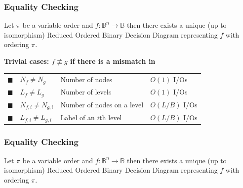 \documentclass[english, aspectratio=169]{beamer}
\newcommand{\B}[0]{\ensuremath{\mathbb{B}}}
\begin{document}
\begin{frame}[t]
  \frametitle{Equality Checking}

  \begin{theorem}[Bryant '86]
    Let $\pi$ be a variable order and $f : \B^n \rightarrow \B$ then there
    exists a unique (up to isomorphism) Reduced Ordered Binary Decision
    Diagram representing $f$ with ordering $\pi$.
  \end{theorem}

  \pause
  {\bf Trivial cases: $f \not \equiv g$ if there is a mismatch in}

  \begin{tabular}{c l l l}
    {\tiny $\blacksquare$} & $N_f \neq N_g$       & Number of nodes            & $O(1)$ I/Os
    \\
    {\tiny $\blacksquare$} & $L_f \neq L_g$       & Number of levels           & $O(1)$ I/Os
    \\
    {\tiny $\blacksquare$} & $N_{f,i} \neq N_{g,i}$ & Number of nodes on a level & $O(L/B)$ I/Os
    \\
    {\tiny $\blacksquare$} & $L_{f,i} \neq L_{g,i}$ & Label of an $i$th level    & $O(L/B)$ I/Os
  \end{tabular}
\end{frame}

\begin{frame}[t]
  \frametitle{Equality Checking}

  \begin{theorem}[Bryant '86]
    Let $\pi$ be a variable order and $f : \B^n \rightarrow \B$ then there
    exists a unique (up to isomorphism) Reduced Ordered Binary Decision
    Diagram representing $f$ with ordering $\pi$.
  \end{theorem}

  \begin{figure}
    \centering

    \begin{tikzpicture}[scale=1, every node/.style={transform shape}]
      
    \end{tikzpicture}
  \end{figure}

\end{frame}
\end{document}
